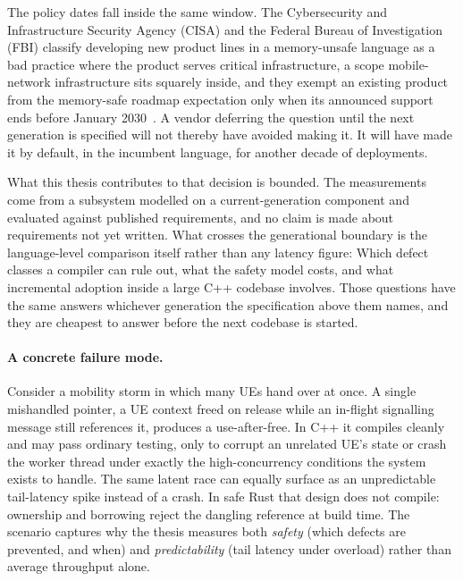 The policy dates fall inside the same window. The Cybersecurity and Infrastructure Security
Agency (CISA) and the Federal Bureau of Investigation (FBI) classify developing new product lines
in a memory-unsafe language as a bad practice where the product serves critical infrastructure, a
scope mobile-network infrastructure sits squarely inside, and they exempt an existing product
from the memory-safe roadmap expectation only when its announced support ends before January
2030~\cite{cisa2025badpractices}. A vendor deferring the question until the next generation is
specified will not thereby have avoided making it. It will have made it by default, in the
incumbent language, for another decade of deployments.

What this thesis contributes to that decision is bounded. The measurements come from a subsystem
modelled on a current-generation component and evaluated against published requirements, and no
claim is made about requirements not yet written. What crosses the generational boundary is the
language-level comparison itself rather than any latency figure: Which defect classes a compiler
can rule out, what the safety model costs, and what incremental adoption inside a large C++
codebase involves. Those questions have the same answers whichever generation the specification
above them names, and they are cheapest to answer before the next codebase is started.

\paragraph{A concrete failure mode.}
Consider a mobility storm in which many UEs hand over at once. A single mishandled pointer, a UE
context freed on release while an in-flight signalling message still references it, produces a
use-after-free. In C++ it compiles cleanly and may pass ordinary testing, only to corrupt an
unrelated UE's state or crash the worker thread under exactly the high-concurrency conditions the
system exists to handle. The same latent race can equally surface as an unpredictable
tail-latency spike instead of a crash. In safe Rust that design does not compile: ownership and
borrowing reject the dangling reference at build time. The scenario captures why the thesis
measures both \emph{safety} (which defects are prevented, and when) and \emph{predictability}
(tail latency under overload) rather than average throughput alone.

